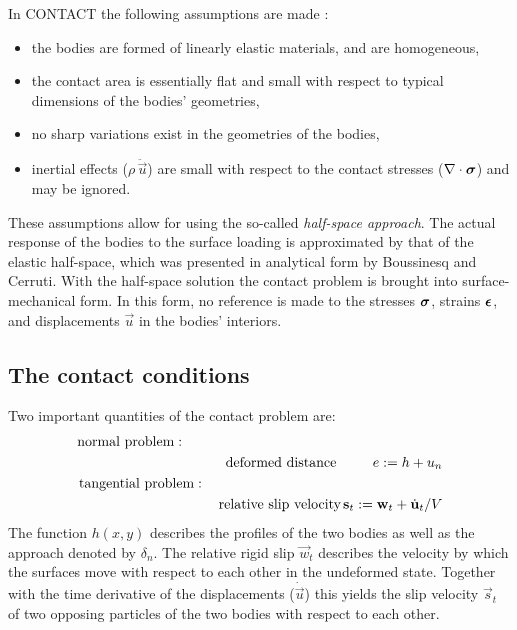 \documentclass[12pt]{report}
\begin{document}
In CONTACT the following assumptions are made \cite{Kalker1990}:
\begin{itemize}
\item the bodies are formed of linearly elastic materials, and are
        homogeneous,
\item the contact area is essentially flat and small with respect to
        typical dimensions of the bodies' geometries,
\item no sharp variations exist in the geometries of the bodies,
\item inertial effects ($\rho\,\ddot{\vec{u}}$) are small with respect to
        the contact stresses ($\nabla\cdot\boldsymbol{\sigma}$) and may be ignored.
\end{itemize}
These assumptions allow for using the so-called {\em half-space approach\/}.
The actual response of the bodies to the surface loading is approximated by
that of the elastic half-space, which was presented in analytical form by
Boussinesq and Cerruti. With the half-space solution the contact problem
is brought into surface-mechanical form. In this form, no reference is made
to the stresses $\boldsymbol{\sigma}$, strains $\boldsymbol{\epsilon}$, and displacements $\vec{u}$
in the bodies' interiors.

\subsection{The contact conditions}

Two important quantities of the contact problem are:
\begin{eqnarray}
\mbox{normal problem} : \hspace{40mm} && \nonumber \\
        \mbox{deformed distance } &&  \hspace{-3mm} e := h + u_n
                \label{eq:def_dist} \\
\mbox{tangential problem} : \hspace{35mm} && \nonumber \\
        \mbox{relative slip velocity} && \hspace{-3mm}
                \vec{s}_t := \vec{w}_t + \dot{\vec{u}}_t / V
                \label{eq:def_slip}
\end{eqnarray}
The function $h(x,y)$ describes the profiles of the two bodies as well
as the approach denoted by $\delta_n$. The relative rigid slip
$\vec{w}_t$ describes the velocity by which the surfaces move with respect
to each other in the undeformed state. Together with the time derivative of
the displacements ($\dot{\vec{u}}$) this yields the slip velocity $\vec{s}_t$
of two opposing particles of the two bodies with respect to each other.
\end{document}
